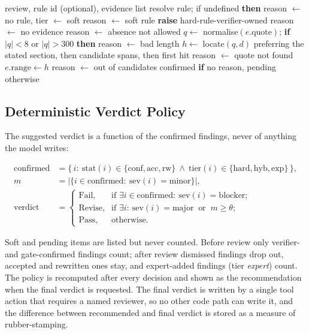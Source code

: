 \documentclass{IOS-Book-Article}
\begin{document}
\begin{algorithm}[t]
\caption{Evidence gate (simplified).}
\label{alg:gate}
\begin{algorithmic}[1]
\Require review, rule id (optional), evidence list
\State resolve rule; if undefined \textbf{then} reason $\leftarrow$ no rule, tier $\leftarrow$ soft
 reason $\leftarrow$ soft rule \EndIf
{} \textbf{raise} hard-rule-verifier-owned \EndIf
{} reason $\leftarrow$ no evidence \EndIf
{}
    reason $\leftarrow$ absence not allowed \EndIf
  \State $q\leftarrow$ normalise$(e.\text{quote})$; \textbf{if} $|q|<8$ or $|q|>300$ \textbf{then} reason $\leftarrow$ bad length
  \State $h\leftarrow$ locate$(q,d)$ preferring the stated section, then candidate spans, then first hit
   reason $\leftarrow$ quote not found \Else{} $e.\text{range}\leftarrow h$ \EndIf
   reason $\leftarrow$ out of candidates \EndIf
\EndFor
\State \Return confirmed \textbf{if} no reason, pending otherwise
\end{algorithmic}
\end{algorithm}

\subsection{Deterministic Verdict Policy}

The suggested verdict is a function of the confirmed findings, never of anything the model writes:
\begin{small}
\begin{align*}
\text{confirmed} &= \{\,i:\ \text{stat}(i)\in\{\text{conf},\text{acc},\text{rw}\}\ \wedge\ \text{tier}(i)\in\{\text{hard},\text{hyb},\text{exp}\}\,\},\\
m &= |\{i\in\text{confirmed}:\ \text{sev}(i)=\text{minor}\}|,\\
\text{verdict} &=
\begin{cases}
\text{Fail}, & \text{if }\exists i\in\text{confirmed}:\ \text{sev}(i)=\text{blocker};\\
\text{Revise}, & \text{if }\exists i:\ \text{sev}(i)=\text{major}\ \text{ or }\ m\ge\theta;\\
\text{Pass}, & \text{otherwise}.
\end{cases}
\end{align*}
\end{small}
Soft and pending items are listed but never counted. Before review only verifier- and gate-confirmed findings count; after review dismissed findings drop out, accepted and rewritten ones stay, and expert-added findings (tier \emph{expert}) count. The policy is recomputed after every decision and shown as the recommendation when the final verdict is requested. The final verdict is written by a single tool action that requires a named reviewer, so no other code path can write it, and the difference between recommended and final verdict is stored as a measure of rubber-stamping.
\end{document}
